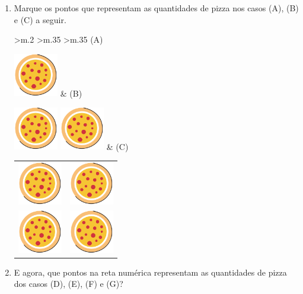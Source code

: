 \documentclass[10 pt,usenames,dvipsnames, oneside]{article}
\begin{document}
\begin{enumerate} %
\item    Marque os pontos que representam as quantidades de pizza nos casos (A), (B) e (C) a seguir.
  
\begin{center}
\begin{tabular}{>{\centering\arraybackslash}m{} >{\centering\arraybackslash}m{} >{\centering\arraybackslash}m{}}
(A)

\includegraphics[width=55pt, keepaspectratio]{pizza.png}  & (B)

\includegraphics[width=55pt, keepaspectratio]{pizza.png} \includegraphics[width=55pt, keepaspectratio]{pizza.png} & (C)

\begin{tabular}{cc}
\includegraphics[width=55pt, keepaspectratio]{pizza.png}&
\includegraphics[width=55pt, keepaspectratio]{pizza.png}\\
\includegraphics[width=55pt, keepaspectratio]{pizza.png} & 
\includegraphics[width=55pt, keepaspectratio]{pizza.png}
\end{tabular}
\end{tabular}
\end{center}

\item  E agora, que pontos na reta numérica representam as quantidades de pizza dos casos (D), (E), (F) e (G)? 
\end{enumerate} 
\end{document}
